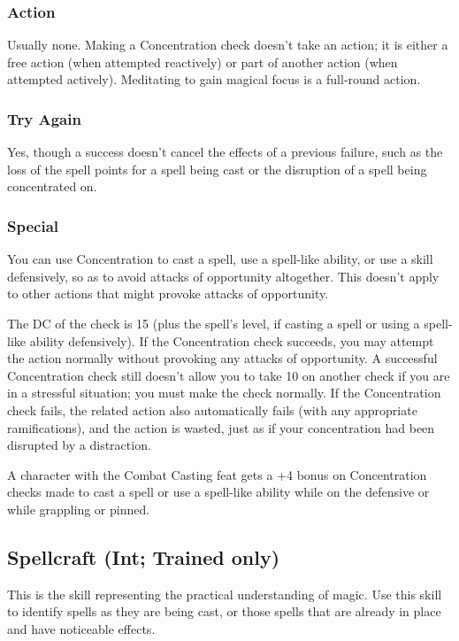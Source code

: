 \subsubsection{Action}
Usually none. Making a Concentration check doesn't take an action; it is either a free action (when attempted reactively) or part of another action (when attempted actively).
Meditating to gain magical focus is a full-round action. 
\subsubsection{Try Again}
Yes, though a success doesn't cancel the effects of a previous failure, 
such as the loss of the spell points for a spell being cast or the disruption of a spell being concentrated on. 
\subsubsection{Special}
You can use Concentration to cast a spell, use a spell-like ability, or use a skill defensively, so as to avoid attacks of opportunity altogether. 
This doesn't apply to other actions that might provoke attacks of opportunity.

The DC of the check is 15 (plus the spell's level, if casting a spell or using a spell-like ability defensively). 
If the Concentration check succeeds, you may attempt the action normally without provoking any attacks of opportunity. 
A successful Concentration check still doesn't allow you to take 10 on another check if you are in a stressful situation; 
you must make the check normally. If the Concentration check fails, the related action also automatically fails (with any appropriate ramifications), 
and the action is wasted, just as if your concentration had been disrupted by a distraction.

A character with the Combat Casting feat gets a +4 bonus on Concentration checks made to cast a spell or use a spell-like ability while on the defensive or while grappling or pinned.
\subsection[Spellcraft]{Spellcraft (Int; Trained only)}
\label{sec:Spellcraft}
This is the skill representing the practical understanding of magic.
Use this skill to identify spells as they are being cast, 
or those spells that are already in place and have noticeable effects.

